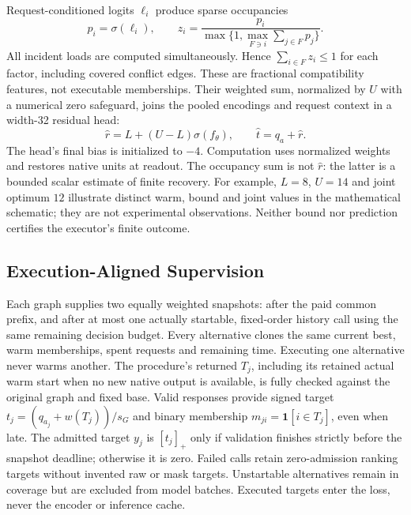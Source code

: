Request-conditioned logits $\ell_i$ produce sparse occupancies
\begin{equation}
 p_i=\sigma(\ell_i),\qquad
 z_i=\frac{p_i}{\max\{1,\max_{F\ni i}\sum_{j\in F}p_j\}}.
 \label{eq:residual-occupancy}
\end{equation}
All incident loads are computed simultaneously. Hence
$\sum_{i\in F}z_i\leq1$ for each factor, including covered conflict edges.
These are fractional compatibility features, not executable memberships.
Their weighted sum, normalized by $U$ with a numerical zero safeguard,
joins the pooled encodings and request context in a width-32 residual head:
\begin{equation}
 \widehat r=L+(U-L)\sigma(f_\theta),\qquad
 \widehat t=q_a+\widehat r.
 \label{eq:residual-value}
\end{equation}
The head's final bias is initialized to $-4$. Computation uses normalized
weights and restores native units at readout. The occupancy sum is not
$\widehat r$: the latter is a bounded scalar estimate of finite recovery.
For example, $L=8$, $U=14$ and joint optimum $12$ illustrate distinct
warm, bound and joint values in the mathematical schematic; they are not
experimental observations. Neither bound nor prediction certifies the
executor's finite outcome.

\subsection{Execution-Aligned Supervision}
Each graph supplies two equally weighted snapshots: after the paid common
prefix, and after at most one actually startable, fixed-order history call
using the same remaining decision budget. Every alternative clones the
same current best, warm memberships, spent requests and remaining time.
Executing one alternative never warms another. The procedure's returned $T_j$,
including its retained actual warm start when no new native output is available,
is fully checked against the original graph and fixed base. Valid responses
provide signed target $t_j=(q_{a_j}+w(T_j))/s_G$ and binary membership
$m_{ji}=\mathbf1[i\in T_j]$, even when late. The admitted target $y_j$ is
$[t_j]_+$ only if validation finishes strictly before the snapshot deadline;
otherwise it is zero. Failed calls retain zero-admission ranking targets
without invented raw or mask targets. Unstartable alternatives remain in
coverage but are excluded from model batches.
Executed targets enter the loss, never the encoder or inference cache.

